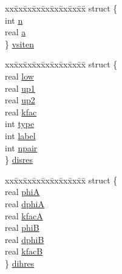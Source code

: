 \begin{DoxyCompactItemize}
\begin{tabbing}
\end{tabbing}\item 
\begin{tabbing}
xx\=xx\=xx\=xx\=xx\=xx\=xx\=xx\=xx\=\kill
struct \{\\
\>int \hyperlink{uniont__iparams_a7c93c2d86d448c4acd9c859248cf2824}{n}\\
\>real \hyperlink{uniont__iparams_a070fd67041cc597a6c1ec5efeee18969}{a}\\
\} \hyperlink{uniont__iparams_a34efe9b205e5af60734b5735ff562f9d}{vsiten}\\

\end{tabbing}\item 
\begin{tabbing}
xx\=xx\=xx\=xx\=xx\=xx\=xx\=xx\=xx\=\kill
struct \{\\
\>real \hyperlink{uniont__iparams_a1a801882e53b5b93a2677663c3cd24cb}{low}\\
\>real \hyperlink{uniont__iparams_aefd97a29531a82503fba6ec4f1e06106}{up1}\\
\>real \hyperlink{uniont__iparams_aa473de5ff349c007f41bc91c5f60a51a}{up2}\\
\>real \hyperlink{uniont__iparams_aa2047a1076195f900b14c9a5fbc12c85}{kfac}\\
\>int \hyperlink{uniont__iparams_aba49a0499479c9556a82f7a4a4684f05}{type}\\
\>int \hyperlink{uniont__iparams_a1c14cb25db59e5658ce18ce068c5cdf4}{label}\\
\>int \hyperlink{uniont__iparams_a2c83583eb09d3b602bb96c51e1cc7423}{npair}\\
\} \hyperlink{uniont__iparams_a92339f4d130a7191a1e6d46756b7f321}{disres}\\

\end{tabbing}\item 
\begin{tabbing}
xx\=xx\=xx\=xx\=xx\=xx\=xx\=xx\=xx\=\kill
struct \{\\
\>real \hyperlink{uniont__iparams_a5c5b19324d8c524116233ac74540ce52}{phiA}\\
\>real \hyperlink{uniont__iparams_ae4e379ba307b522ffc8fd33ad1e9d26a}{dphiA}\\
\>real \hyperlink{uniont__iparams_aa17e882b46390232e8e8ef9c0c1c3911}{kfacA}\\
\>real \hyperlink{uniont__iparams_ad10fa405ec35e5d43c4fec2a1354787c}{phiB}\\
\>real \hyperlink{uniont__iparams_ad410311374219bd1e98269cce7d46e0c}{dphiB}\\
\>real \hyperlink{uniont__iparams_a2f82c736106e59b80725ae4bdef19619}{kfacB}\\
\} \hyperlink{uniont__iparams_af22610d1a4c2cf619c5990a6e8d63bde}{dihres}\\


\end{tabbing}
\end{DoxyCompactItemize}
